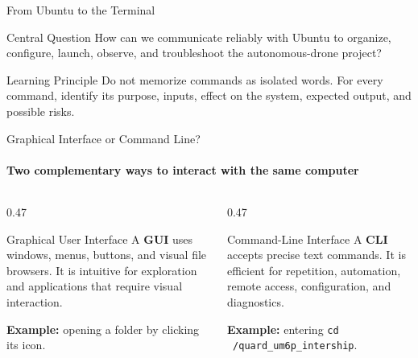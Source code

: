 \begin{frame}{From Ubuntu to the Terminal}
\pause

\begin{alertblock}{Central Question}
How can we communicate reliably with Ubuntu to organize, configure, launch,
observe, and troubleshoot the autonomous-drone project?
\end{alertblock}

\begin{exampleblock}{Learning Principle}
Do not memorize commands as isolated words. For every command, identify its
purpose, inputs, effect on the system, expected output, and possible risks.
\end{exampleblock}
\end{frame}






\begin{frame}{Graphical Interface or Command Line?}
\framesubtitle{Two complementary ways to interact with the same computer}

\footnotesize

\begin{columns}[T,onlytextwidth]
    \begin{column}{0.47\textwidth}
        \begin{block}{Graphical User Interface}
            A \textbf{GUI} uses windows, menus, buttons, and visual file browsers.
            It is intuitive for exploration and applications that require visual interaction.

            \vspace{0.12cm}
            \textbf{Example:} opening a folder by clicking its icon.
        \end{block}
    \end{column}

    \begin{column}{0.47\textwidth}
        \begin{exampleblock}{Command-Line Interface}
            A \textbf{CLI} accepts precise text commands. It is efficient for
            repetition, automation, remote access, configuration, and diagnostics.

            \vspace{0.12cm}
            \textbf{Example:} entering \texttt{cd ~/quard\_um6p\_intership}.
        \end{exampleblock}
    \end{column}
\end{columns}


\end{frame}




